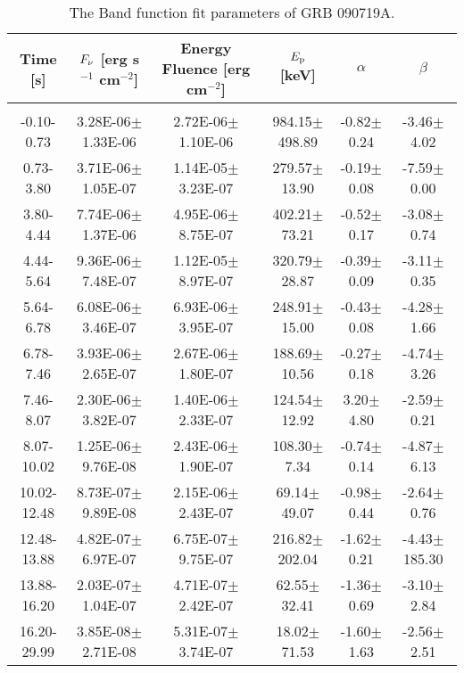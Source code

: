 \begin{table}[h]
\centering
\scriptsize
\label{tab:}
\begin{tabular}{c| c c c c c}
Time [s] & $F_{\nu}$ [erg s$^{-1}$ cm$^{-2}$] & Energy Fluence [erg cm$^{-2}$] & $E_{\rm p}$ [keV] & $\alpha$ & $\beta$ \\
\hline \hline\\ 

-0.10-0.73 & 3.28E-06$\pm$1.33E-06 & 2.72E-06$\pm$1.10E-06 & 984.15$\pm$498.89 & -0.82$\pm$0.24 & -3.46$\pm$4.02 \\ 

0.73-3.80 & 3.71E-06$\pm$1.05E-07 & 1.14E-05$\pm$3.23E-07 & 279.57$\pm$13.90 & -0.19$\pm$0.08 & -7.59$\pm$0.00 \\ 

3.80-4.44 & 7.74E-06$\pm$1.37E-06 & 4.95E-06$\pm$8.75E-07 & 402.21$\pm$73.21 & -0.52$\pm$0.17 & -3.08$\pm$0.74 \\ 

4.44-5.64 & 9.36E-06$\pm$7.48E-07 & 1.12E-05$\pm$8.97E-07 & 320.79$\pm$28.87 & -0.39$\pm$0.09 & -3.11$\pm$0.35 \\ 

5.64-6.78 & 6.08E-06$\pm$3.46E-07 & 6.93E-06$\pm$3.95E-07 & 248.91$\pm$15.00 & -0.43$\pm$0.08 & -4.28$\pm$1.66 \\ 

6.78-7.46 & 3.93E-06$\pm$2.65E-07 & 2.67E-06$\pm$1.80E-07 & 188.69$\pm$10.56 & -0.27$\pm$0.18 & -4.74$\pm$3.26 \\ 

7.46-8.07 & 2.30E-06$\pm$3.82E-07 & 1.40E-06$\pm$2.33E-07 & 124.54$\pm$12.92 & 3.20$\pm$4.80 & -2.59$\pm$0.21 \\ 

8.07-10.02 & 1.25E-06$\pm$9.76E-08 & 2.43E-06$\pm$1.90E-07 & 108.30$\pm$7.34 & -0.74$\pm$0.14 & -4.87$\pm$6.13 \\ 

10.02-12.48 & 8.73E-07$\pm$9.89E-08 & 2.15E-06$\pm$2.43E-07 & 69.14$\pm$49.07 & -0.98$\pm$0.44 & -2.64$\pm$0.76 \\ 

12.48-13.88 & 4.82E-07$\pm$6.97E-07 & 6.75E-07$\pm$9.75E-07 & 216.82$\pm$202.04 & -1.62$\pm$0.21 & -4.43$\pm$185.30 \\ 

13.88-16.20 & 2.03E-07$\pm$1.04E-07 & 4.71E-07$\pm$2.42E-07 & 62.55$\pm$32.41 & -1.36$\pm$0.69 & -3.10$\pm$2.84 \\ 

16.20-29.99 & 3.85E-08$\pm$2.71E-08 & 5.31E-07$\pm$3.74E-07 & 18.02$\pm$71.53 & -1.60$\pm$1.63 & -2.56$\pm$2.51 \\ 

\end{tabular}
\caption{The Band function fit parameters of GRB 090719A.}
\end{table}


